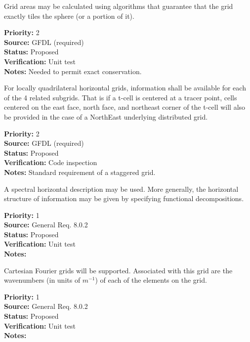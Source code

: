 Grid areas may be calculated using algorithms that guarantee that the grid
exactly tiles the sphere (or a portion of it).
\begin{reqlist}
{\bf Priority:} 2 \\
{\bf Source:} GFDL (required) \\
{\bf Status:} Proposed \\
{\bf Verification:} Unit test\\
{\bf Notes:} Needed to permit exact conservation.
\end{reqlist}


For locally quadrilateral horizontal grids, information shall be available for
each of the 4 related subgrids.  That is if a t-cell is centered at a tracer
point,  cells centered on the east face, north face, and northeast corner of
the t-cell will also be provided in the case of a NorthEast underlying
distributed grid.
\begin{reqlist}
{\bf Priority:} 2 \\
{\bf Source:} GFDL (required) \\
{\bf Status:} Proposed \\
{\bf Verification:} Code inspection\\
{\bf Notes:} Standard requirement of a staggered grid.
\end{reqlist}


A spectral horizontal description may be used.  More generally, the horizontal
structure of information may be given by specifying functional decompositions.
\begin{reqlist}
{\bf Priority:} 1 \\
{\bf Source:} General Req. 8.0.2 \\
{\bf Status:} Proposed \\
{\bf Verification:} Unit test\\
{\bf Notes:}
\end{reqlist}


Cartesian Fourier grids will be supported.  Associated with this grid are the
wavenumbers (in units of $m^{-1}$) of each of the elements on the grid.
\begin{reqlist}
{\bf Priority:} 1 \\
{\bf Source:} General Req. 8.0.2 \\
{\bf Status:} Proposed \\
{\bf Verification:} Unit test\\
{\bf Notes:}
\end{reqlist}

